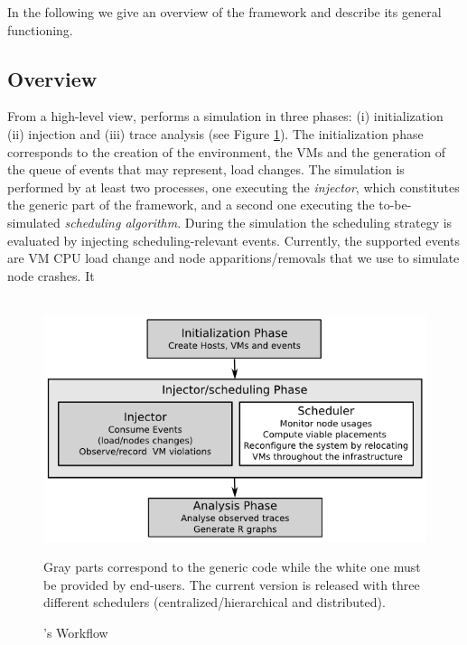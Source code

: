 In the following we give an overview of the framework and describe its
general functioning.%

\subsection{Overview}
\label{sec:overview}

From a high-level view, \vmps performs a simulation in three phases:
(i) initialization (ii) injection and (iii) trace analysis (see Figure
\ref{fig:workflow}).  The initialization phase corresponds to the
creation of the environment, the VMs and the generation of the queue
of events that may represent, \eg load changes.  The
simulation is performed by at least two \sg processes, one executing
the \emph{injector}, which constitutes the generic part of the
framework, and a second one executing the to-be-simulated
\emph{scheduling algorithm}. During the simulation the scheduling
strategy is evaluated by injecting scheduling-relevant events.
Currently, the supported events are VM CPU load change and node
apparitions/removals that we use to simulate node crashes.  It

\begin{figure}
  {\centering ~\includegraphics[width=.95\linewidth]{figures/VMPlaceS-workflow.png}}
  \caption{\vmps's Workflow}
  \label{fig:workflow}
{\small Gray parts correspond to the generic code while the white one
  must be provided by end-users. The current version is released with
  three different schedulers (centralized/hierarchical and distributed).}
\end{figure}


